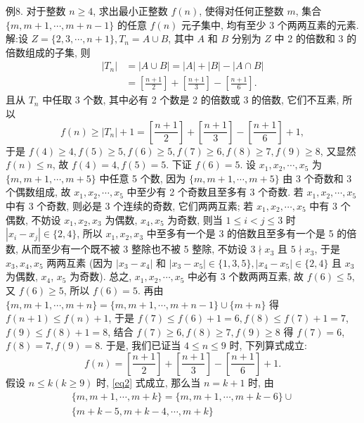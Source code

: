 例8. 对于整数 $n \geqslant 4$, 求出最小正整数 $f(n)$, 使得对任何正整数 $m$, 集合 $\{m, m+1, \cdots, m+n-1\}$ 的任意 $f(n)$ 元子集中, 均有至少 3 个两两互素的元素.
解:设 $Z=\{2,3, \cdots, n+1\}, T_n=A \cup B$, 其中 $A$ 和 $B$ 分别为 $Z$ 中 2 的倍数和 3 的倍数组成的子集, 则
$$
\begin{aligned}
\left|T_n\right| & =|A \cup B|=|A|+|B|-|A \cap B| \\
& =\left[\frac{n+1}{2}\right]+\left[\frac{n+1}{3}\right]-\left[\frac{n+1}{6}\right] .
\end{aligned}
$$
且从 $T_n$ 中任取 3 个数, 其中必有 2 个数是 2 的倍数或 3 的倍数, 它们不互素, 所以
$$
f(n) \geqslant\left|T_n\right|+1=\left[\frac{n+1}{2}\right]+\left[\frac{n+1}{3}\right]-\left[\frac{n+1}{6}\right]+1, \label{eq1}
$$
于是 $f(4) \geqslant 4, f(5) \geqslant 5, f(6) \geqslant 5, f(7) \geqslant 6, f(8) \geqslant 7, f(9) \geqslant 8$, 又显然 $f(n) \leqslant n$, 故 $f(4)=4, f(5)=5$. 下证 $f(6)=5$.
设 $x_1, x_2, \cdots, x_5$ 为 $\{m, m+1, \cdots, m+5\}$ 中任意 5 个数, 因为 $\{m, m+ 1, \cdots, m+5\}$ 由 3 个奇数和 3 个偶数组成, 故 $x_1, x_2, \cdots, x_5$ 中至少有 2 个奇数且至多有 3 个奇数.
若 $x_1, x_2, \cdots, x_5$ 中有 3 个奇数, 则必是 3 个连续的奇数, 它们两两互素; 若 $x_1, x_2, \cdots, x_5$ 中有 3 个偶数, 不妨设 $x_1, x_2, x_3$ 为偶数, $x_4, x_5$ 为奇数, 则当 $1 \leqslant i<j \leqslant 3$ 时 $\left|x_i-x_j\right| \in\{2,4\}$, 所以 $x_1, x_2, x_3$ 中至多有一个是 3 的倍数且至多有一个是 5 的倍数, 从而至少有一个既不被 3 整除也不被 5 整除, 不妨设 $3 \nmid x_3$ 且 $5 \nmid x_3$, 于是 $x_3, x_4, x_5$ 两两互素 (因为 $\left|x_3-x_4\right|$ 和 $\left|x_3-x_5\right| \in\{1,3,5\},\left|x_4-x_5\right| \in\{2,4\}$ 且 $x_3$ 为偶数, $x_4$, $x_5$ 为奇数). 总之, $x_1, x_2, \cdots, x_5$ 中必有 3 个数两两互素, 故 $f(6) \leqslant 5$, 又 $f(6) \geqslant 5$, 所以 $f(6)=5$.
再由 $\{m, m+1, \cdots, m+n\}=\{m, m+1, \cdots, m+n-1\} \cup\{m+n\}$ 得 $f(n+1) \leqslant f(n)+1$, 于是 $f(7) \leqslant f(6)+1=6, f(8) \leqslant f(7)+1=7$, $f(9) \leqslant f(8)+1=8$, 结合 $f(7) \geqslant 6, f(8) \geqslant 7, f(9) \geqslant 8$ 得 $f(7)=6$, $f(8)=7, f(9)=8$. 于是, 我们已证当 $4 \leqslant n \leqslant 9$ 时, 下列算式成立:
$$
f(n)=\left[\frac{n+1}{2}\right]+\left[\frac{n+1}{3}\right]-\left[\frac{n+1}{6}\right]+1 . \label{eq2}
$$
假设 $n \leqslant k(k \geqslant 9)$ 时, \ref{eq2} 式成立, 那么当 $n=k+1$ 时, 由
$$
\begin{gathered}
\{m, m+1, \cdots, m+k\}=\{m, m+1, \cdots, m+k-6\} \cup \\
\{m+k-5, m+k-4, \cdots, m+k\}
\end{gathered}
$$
